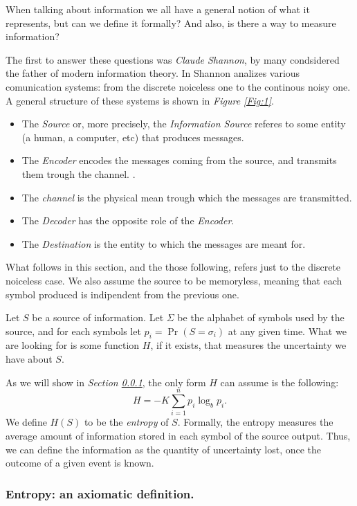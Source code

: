 \documentclass{subfiles}
\begin{document}
    When talking about information we all have a general notion of what it represents,
        but can we define it formally? And also, is there a way to measure information?

    The first to answer these questions was \emph{Claude Shannon}, 
        by many condsidered the father of modern information theory.
    In \cite{ShannonEntropy} Shannon analizes various comunication systems:
        from the discrete noiceless one to the continous noisy one.
    A general structure of these systems is shown in \emph{Figure \ref{Fig:1}}.
    

    \begin{itemize}
        \item The \emph{Source} or, more precisely, 
            the \emph{Information Source} referes to some entity
            (a human, a computer, etc) that produces messages.

        \item The \emph{Encoder} encodes the messages coming from the source,
            and transmits them trough the channel.
.
        \item The \emph{channel} is the physical mean trough which the messages
            are transmitted.

        \item The \emph{Decoder} has the opposite role of the \emph{Encoder}.
        \item The \emph{Destination} is the entity to which the messages are meant for.
    \end{itemize}

    \begin{remark*}
        What follows in this section, and the those following,
        refers just to the discrete noiceless case. 
        We also assume the source to be memoryless, 
        meaning that each symbol produced is indipendent from the previous one.
    \end{remark*}

    Let \(S\) be a source of information. 
    Let \(\Sigma\) be the alphabet of symbols used by the source,
    and for each symbols let \(p_{i} = \Pr(S = \sigma_{i})\) at any given time.
    What we are looking for is some function \(H\), if it exists,
    that measures the uncertainty we have about \(S\).

    As we will show in \emph{Section \ref{Sec:1.1.1}}, 
        the only form \(H\) can assume is the following:
    \begin{equation}\label{Eq:1}
        H = -K \sum_{i = 1}^{n}{p_{i} \log_{b} p_{i}}.
    \end{equation}
    We define \(H(S)\) to be the \emph{entropy} of \(S\). 
    Formally, the entropy measures the average amount of information stored 
        in each symbol of the source output.
        Thus, we can define the information as the quantity of uncertainty lost,
        once the outcome of a given event is known.

    \subsubsection{Entropy: an axiomatic definition.}\label{Sec:1.1.1}
    
\end{document}
